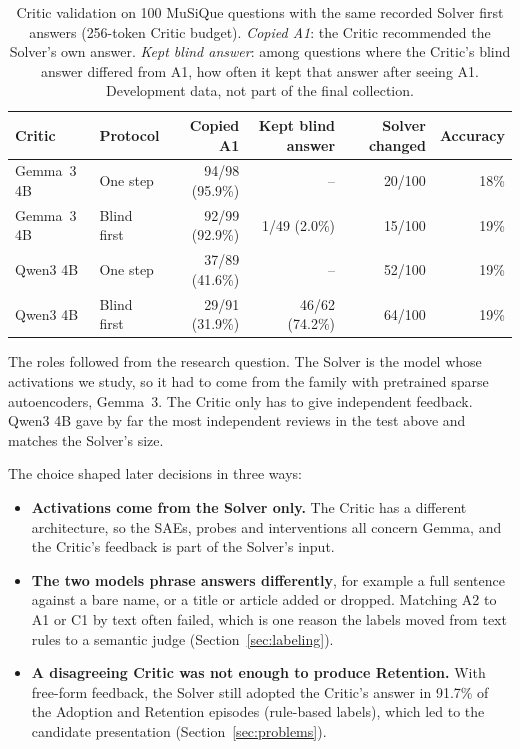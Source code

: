 \begin{table}[htbp]
    \centering
    \caption{Critic validation on 100 MuSiQue questions with the same recorded
    Solver first answers (256-token Critic budget). \emph{Copied A1}: the
    Critic recommended the Solver's own answer. \emph{Kept blind answer}:
    among questions where the Critic's blind answer differed from A1, how often
    it kept that answer after seeing A1. Development data, not part of the
    final collection.}
    \label{tab:critic-comparison}
    \begin{tabular}{llrrrr}
        \toprule
        Critic & Protocol & Copied A1 & Kept blind answer & Solver changed & Accuracy \\
        \midrule
        Gemma~3 4B & One step   & 94/98 (95.9\%) & --             & 20/100 & 18\% \\
        Gemma~3 4B & Blind first & 92/99 (92.9\%) & 1/49 (2.0\%)   & 15/100 & 19\% \\
        Qwen3 4B   & One step   & 37/89 (41.6\%) & --             & 52/100 & 19\% \\
        Qwen3 4B   & Blind first & 29/91 (31.9\%) & 46/62 (74.2\%) & 64/100 & 19\% \\
        \bottomrule
    \end{tabular}
\end{table}

The roles followed from the research question. The Solver is the model whose
activations we study, so it had to come from the family with pretrained
sparse autoencoders, Gemma~3. The Critic only has to give independent
feedback. Qwen3 4B gave by far the most independent reviews in the test above
and matches the Solver's size.

The choice shaped later decisions in three ways:
\begin{itemize}
    \item \textbf{Activations come from the Solver only.} The Critic has a
    different architecture, so the SAEs, probes and interventions all concern
    Gemma, and the Critic's feedback is part of the Solver's input.
    \item \textbf{The two models phrase answers differently}, for example a
    full sentence against a bare name, or a title or article added or dropped.
    Matching A2 to A1 or C1 by text often failed, which is one reason the
    labels moved from text rules to a semantic judge
    (Section~\ref{sec:labeling}).
    \item \textbf{A disagreeing Critic was not enough to produce Retention.}
    With free-form feedback, the Solver still adopted the Critic's answer in
    91.7\% of the Adoption and Retention episodes (rule-based labels), which
    led to the candidate presentation
    (Section~\ref{sec:problems}).
\end{itemize}

